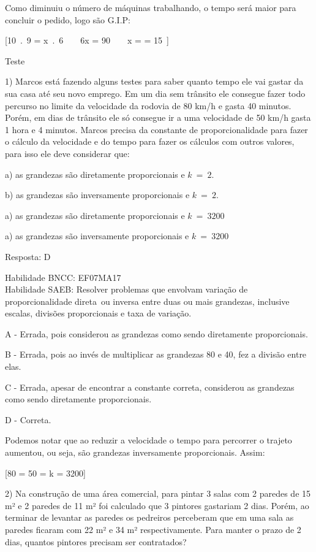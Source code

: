 Como diminuiu o número de máquinas trabalhando, o tempo será maior para
concluir o pedido, logo são G.I.P:

[10\ .\ 9 = x\ .\ 6\  \rightarrow \ \ \ 6x = 90\  \rightarrow \ \ \ x =  = 15\ ]

Teste

1) Marcos está fazendo alguns testes para saber quanto tempo ele vai
gastar da sua casa até seu novo emprego. Em um dia sem trânsito ele
consegue fazer todo percurso no limite da velocidade da rodovia de 80
km/h e gasta 40 minutos. Porém, em dias de trânsito ele só consegue ir a
uma velocidade de 50 km/h gasta 1 hora e 4 minutos. Marcos precisa da
constante de proporcionalidade para fazer o cálculo da velocidade e do
tempo para fazer os cálculos com outros valores, para isso ele deve
considerar que:

a) as grandezas são diretamente proporcionais e \(k\  = \ 2\).

b) as grandezas são inversamente proporcionais e \(k\  = \ 2.\)

a) as grandezas são diretamente proporcionais e \(k\  = \ 3200\)

a) as grandezas são inversamente proporcionais e \(k\  = \ 3200\)

Resposta: D

Habilidade BNCC: EF07MA17\\
Habilidade SAEB: Resolver problemas que envolvam variação de
proporcionalidade direta~ou inversa entre duas ou mais grandezas,
inclusive escalas, divisões proporcionais e taxa de variação.

A - Errada, pois considerou as grandezas como sendo diretamente
proporcionais.

B - Errada, pois ao invés de multiplicar as grandezas 80 e 40, fez a
divisão entre elas.

C - Errada, apesar de encontrar a constante correta, considerou as
grandezas como sendo diretamente proporcionais.

D - Correta.

Podemos notar que ao reduzir a velocidade o tempo para percorrer o
trajeto aumentou, ou seja, são grandezas inversamente proporcionais.
Assim:

[80  = 50  = k = 3200]

2) Na construção de uma área comercial, para pintar 3 salas com 2
paredes de 15 m² e 2 paredes de 11 m² foi calculado que 3 pintores
gastariam 2 dias. Porém, ao terminar de levantar as paredes os pedreiros
perceberam que em uma sala as paredes ficaram com 22 m² e 34 m²
respectivamente. Para manter o prazo de 2 dias, quantos pintores
precisam ser contratados?

